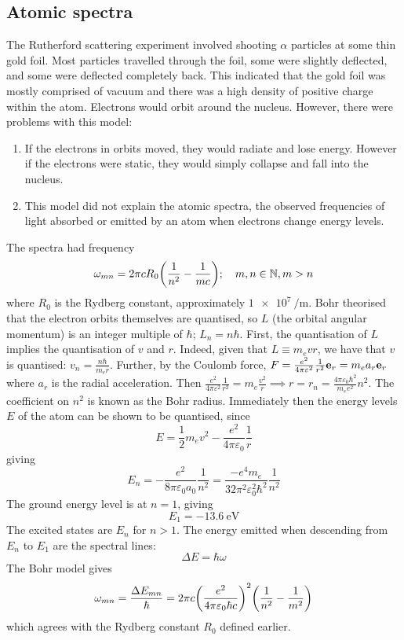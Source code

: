\subsection{Atomic spectra}
The Rutherford scattering experiment involved shooting \( \alpha \) particles at some thin gold foil.
Most particles travelled through the foil, some were slightly deflected, and some were deflected completely back.
This indicated that the gold foil was mostly comprised of vacuum and there was a high density of positive charge within the atom.
Electrons would orbit around the nucleus.
However, there were problems with this model:
\begin{enumerate}
	\item If the electrons in orbits moved, they would radiate and lose energy.
	      However if the electrons were static, they would simply collapse and fall into the nucleus.
	\item This model did not explain the atomic spectra, the observed frequencies of light absorbed or emitted by an atom when electrons change energy levels.
\end{enumerate}
The spectra had frequency
\[
	\omega_{mn} = 2 \pi c R_0 \qty(\frac{1}{n^2} - \frac{1}{mc}); \quad m, n \in \mathbb N, m > n
\]
where \( R_0 \) is the Rydberg constant, approximately \( \SI{1e7}{\per\metre} \).
Bohr theorised that the electron orbits themselves are quantised, so \( L \) (the orbital angular momentum) is an integer multiple of \( \hbar \); \( L_n = n \hbar \).
First, the quantisation of \( L \) implies the quantisation of \( v \) and \( r \).
Indeed, given that \( L \equiv m_e v r \), we have that \( v \) is quantised: \( v_n = \frac{n\hbar}{m_e r} \).
Further, by the Coulomb force, \( F = \frac{e^2}{4 \pi \varepsilon^2} \frac{1}{r^2} \vb e_r = m_e a_r \vb e_r \) where \( a_r \) is the radial acceleration.
Then \( \frac{e^2}{4 \pi \varepsilon^2} \frac{1}{r^2} = m_e \frac{v^2}{r} \implies r = r_n = \frac{4 \pi \varepsilon_0 \hbar^2}{m_e e^2} n^2 \).
The coefficient on \( n^2 \) is known as the Bohr radius.
Immediately then the energy levels \( E \) of the atom can be shown to be quantised, since
\[
	E = \frac{1}{2} m_e v^2 - \frac{e^2}{4 \pi \varepsilon_0} \frac{1}{r}
\]
giving
\[
	E_n = -\frac{e^2}{8 \pi \varepsilon_0 a_0} \frac{1}{n^2} = \frac{-e^4 m_e}{32 \pi^2 \varepsilon_0^2 \hbar^2} \frac{1}{n^2}
\]
The ground energy level is at \( n = 1 \), giving
\[
	E_1 = -\SI{13.6}{\eV}
\]
The excited states are \( E_n \) for \( n > 1 \).
The energy emitted when descending from \( E_n \) to \( E_1 \) are the spectral lines:
\[
	\Delta E = \hbar \omega
\]
The Bohr model gives
\[
	\omega_{mn} = \frac{\Delta E_{mn}}{\hbar} = 2 \pi c \qty( \frac{e^2}{4 \pi \varepsilon_0 \hbar c} )^2 \qty( \frac{1}{n^2} - \frac{1}{m^2} )
\]
which agrees with the Rydberg constant \( R_0 \) defined earlier.
